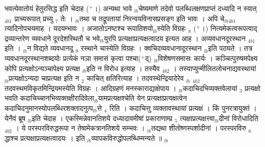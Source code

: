 \documentclass[article,12pt,a4paper]{memoir}%
\newcommand{\add}[1]{($^{+}$#1)}
\newcounter{parCount}
\begin{document}
भवत्येवातोयं हेतुरसिद्ध इति चेदाह \add{।} {\color{DodgerBlue3}अन्यथा भावे} {\tiny $_{lb}$}चेष्यमाणे {\color{DodgerBlue3}तदेवो} पलब्धिलक्षणप्राप्तं दध्यादि {\color{DodgerBlue3}न स्यात्} {\tiny $_{4b1}$} प्राच्यरूपात् प्रच्यु {\tiny $_{7}$} तेः । {\tiny $_{lb}$}तथा च तद्रूपतायां निरन्वयविनासप्रसङ्ग इति भावः । {\color{DodgerBlue3}अपि चे}{\tiny $_{lb}$}{\tiny $_{4b1}$}त्यादिनोपचयमाह । यदयम्भावः । अजातोऽनष्टश्च रूपातिशयो{\tiny $_{lb}$}स्येति विग्रहः {\tiny $_{8}$} \add{।} नित्यमेकत्वरूपत्वाद् द्रव्यान्तरेण व्यवधाने दूरदेशस्थितौ च भवे{\tiny $_{lb}$}युरपि प्रत्यक्षाप्रत्यक्षत्वादय इत्यत आह । {\color{DodgerBlue3}अव्यवधानदूरस्थान} {\tiny $_{4b1}$} इति । {\tiny $_{lb}$}न विद्यते व्यवधानदू {\tiny $_{9}$} \leavevmode{} रस्थाने चास्येति विग्रहः । क्वचिदव्यवधानादूरस्थान {\tiny $_{lb}$}इति पठ्यते । तत्र व्यवधानदूरस्थानशब्दयोः प्रत्येकं नञा समासं कृत्वा पश्चा\add{द्} {\tiny $_{lb}$}विशेषणसमासः कार्यः । कञ्चित्पुरुषमपेक्ष्य कोपि प्रत्यक्षोऽन्यञ्चापेक्ष्य प्रत्यक्ष {\tiny $_{lb}$}इति न विरोध इत्याह । {\color{DodgerBlue3}तस्यैव} {\tiny $_{4b2}$} । तस्याप्युन्मीलितलोचनाद्यवस्थायां {\tiny $_{lb}$}प्रत्यक्षोऽन्यदा चाप्रत्यक्ष इति न {\tiny $_{2}$} काचित् क्षतिरित्याह । {\color{DodgerBlue3}तदवस्थेन्द्रियादेरेव} {\tiny $_{lb}$} {\tiny $_{4b2}$} तदवस्थमविकृतमिन्द्रियमस्येति विग्रहः । आदिग्रहणं मनस्काराद्याक्षेपाय । {\tiny $_{lb}$}कदाचिदभिव्यक्तवेलायां {\tiny $_{3}$} प्रत्यक्षो भवति कदाचिच्चानभिव्यक्तक्षीरादिवेला{\tiny $_{lb}$}यामप्रत्यक्षश्चेति येन प्रत्यक्षाप्रत्यक्षत्वेन कदाचिदनुमानस्योपलब्धिरशक्तादनुत्प{\tiny $_{lb}$}त्ते {\tiny $_{4}$} रिति । कदाचित्तु व्यक्तावस्थायां प्रत्यक्षं । किं पुनरत्रायुक्तं । येनैवं ब्रूष {\tiny $_{lb}$}इति चेदाह । एकस्मिन्नेवानतिशये दध्यादावमीषां प्रकाराणाम्प्र {\tiny $_{5}$} त्यक्षाप्रत्यक्षत्त्वा{\tiny $_{lb}$}दीनां {\color{DodgerBlue3}विरोधादिति} {\tiny $_{4b2}$} । ये परस्परविरुद्धरूपा न तेषामेकत्रानतिशये सम्भवः । {\tiny $_{lb}$}तद्यथा शीतोष्णस्पर्शादीनां । परस्परविरु {\tiny $_{6}$} द्धाश्च प्रत्यक्षाप्रत्यक्षत्वादयः । इति {\tiny $_{lb}$}व्यापकविरुद्धोपलब्धिम्मन्यते ॥
	{}
	\pend%
      {\tiny $_{lb}$}
\end{document}
